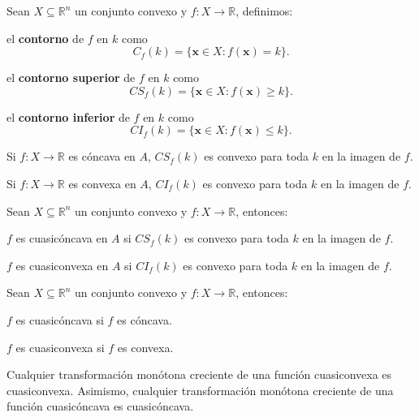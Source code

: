 \documentclass[8pt,a4paper]{extarticle}
\begin{document}
\begin{multicols}{3}
	\begin{boxdef}
		Sean $X \subseteq \mathbb{R}^n$ un conjunto convexo y $f : X \to \mathbb{R}$, definimos:
		\begin{bulletlist}
			\item el \textbf{contorno} de $f$ en $k$ como $$C_f(k) = \{\mathbf{x} \in X : f(\mathbf{x}) = k\}.$$
			\item el \textbf{contorno superior} de $f$ en $k$ como $$CS_f(k) = \{\mathbf{x} \in X : f(\mathbf{x}) \ge k\}.$$
			\item el \textbf{contorno inferior} de $f$ en $k$ como $$CI_f(k) = \{\mathbf{x} \in X : f(\mathbf{x}) \le k\}.$$
		\end{bulletlist}
	\end{boxdef}

	\begin{boxtheo}[]
		\begin{eqlist}
			\item Si $f : X \to \mathbb{R}$ es cóncava en $A$, $CS_f(k)$ es convexo para toda $k$ en la imagen de $f$.
			\item Si $f : X \to \mathbb{R}$ es convexa en $A$, $CI_f(k)$ es convexo para toda $k$ en la imagen de $f$.
		\end{eqlist}
	\end{boxtheo}

	\begin{boxtheo}[]
		Sean $X \subseteq \mathbb{R}^n$ un conjunto convexo y $f : X \to \mathbb{R}$, entonces:
		\begin{eqlist}
			\item $f$ es cuasicóncava en $A$ si $CS_f (k)$ es convexo para toda $k$ en la imagen de $f$.
			\item $f$ es cuasiconvexa en $A$ si $CI_f (k)$ es convexo para toda $k$ en la imagen de $f$.
		\end{eqlist}
	\end{boxtheo}

	\begin{boxtheo}[]
		Sean $X \subseteq \mathbb{R}^n$ un conjunto convexo y $f : X \to \mathbb{R}$, entonces:
		\begin{eqlist}
			\item $f$ es cuasicóncava si $f$ es cóncava.
			\item $f$ es cuasiconvexa si $f$ es convexa.
		\end{eqlist}
	\end{boxtheo}

	\begin{boxtheo}[]
		Cualquier transformación monótona creciente de una función cuasiconvexa es cuasiconvexa. Asimismo, cualquier transformación monótona creciente de una función cuasicóncava es cuasicóncava.
	\end{boxtheo}


\end{multicols}
\end{document}
